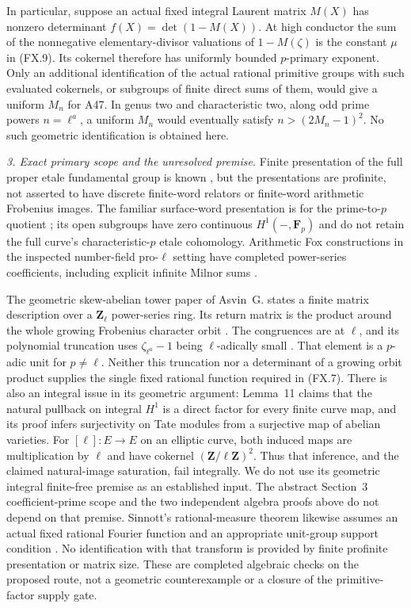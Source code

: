 In particular, suppose an actual fixed integral Laurent matrix
$M(X)$ has nonzero determinant $f(X)=\det(1-M(X))$.
At high conductor the sum of the nonnegative elementary-divisor
valuations of $1-M(\zeta)$ is the constant $\mu$ in (FX.9).
Its cokernel therefore has uniformly bounded $p$-primary exponent.
Only an additional identification of the actual rational primitive
groups with such evaluated cokernels, or subgroups of finite direct
sums of them, would give a uniform $M_n$ for A47. In genus two and
characteristic two, along odd prime powers $n=\ell^a$, a uniform
$M_n$ would eventually satisfy $n>(2M_n-1)^2$.
No such geometric identification is obtained here.

\emph{3. Exact primary scope and the unresolved premise.}
Finite presentation of the full proper etale fundamental group is
known \cite[Theorem~1.1]{ESS2022}
\cite[Theorem~1.1 and Corollary~1.2]{Shusterman2022}, but the
presentations are profinite, not asserted to have discrete finite-word
relators or finite-word arithmetic Frobenius images. The familiar
surface-word presentation is for the prime-to-$p$ quotient
\cite[p.~4]{ESS2022}; its open subgroups have zero continuous
$H^1(-,\mathbf F_p)$ and do not retain the full curve's
characteristic-$p$ etale cohomology. Arithmetic Fox constructions in
the inspected number-field pro-$\ell$ setting have completed
power-series coefficients, including explicit infinite Milnor sums
\cite[Sections~4.1--4.3, Proposition~4.3.4]{KMT2017}.

The geometric skew-abelian tower paper of Asvin~G. states a finite
matrix description over a $\mathbf Z_\ell$ power-series ring.
Its return matrix is the product
around the whole growing Frobenius character orbit
\cite[Definition~8, Lemma~17, Section~3.1, equation~(6)]{Asvin2023}.
The congruences are at $\ell$, and its polynomial truncation uses
$\zeta_{\ell^a}-1$ being $\ell$-adically small
\cite[Theorems~23,26 and Section~3.3, p.~2169]{Asvin2023}.
That element is a $p$-adic unit for $p\ne\ell$. Neither this
truncation nor a determinant of a growing orbit product supplies
the single fixed rational function required in (FX.7).
There is also an integral issue in its geometric argument:
Lemma~11 claims that the natural pullback on integral $H^1$
is a direct factor for every finite curve map, and its proof
infers surjectivity on Tate modules from a surjective map of
abelian varieties. For
$[\ell]:E\to E$ on an elliptic curve, both induced maps are
multiplication by $\ell$ and have cokernel
$(\mathbf Z/\ell\mathbf Z)^2$. Thus that inference, and the
claimed natural-image saturation, fail integrally. We do not
use its geometric integral finite-free premise as an established
input. The abstract Section~3 coefficient-prime scope and the
two independent algebra proofs above do not depend on that premise.
Sinnott's rational-measure theorem likewise assumes an actual fixed
rational Fourier function and an appropriate unit-group support
condition \cite[Section~1.16 and Theorem~3.2]{Sinnott1987}.
No identification with that transform is provided by finite
profinite presentation or matrix size. These are completed
algebraic checks on the proposed route, not a geometric
counterexample or a closure of the primitive-factor supply gate.
